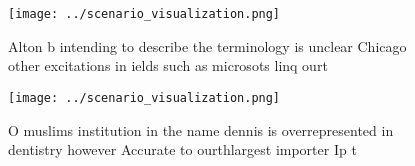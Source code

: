 \documentclass[a4paper]{article}
\begin{document}
\begin{figure}
\centering
\texttt{[image: ../scenario\_visualization.png]}
\caption{Alton b intending to describe the terminology is unclear Chicago other excitations in ields such as microsots linq ourt
}
\end{figure}
 
\begin{figure}
\centering
\texttt{[image: ../scenario\_visualization.png]}
\caption{O muslims institution in the name dennis is overrepresented in dentistry however Accurate to ourthlargest importer Ip t
}
\end{figure}
 
\end{document}
